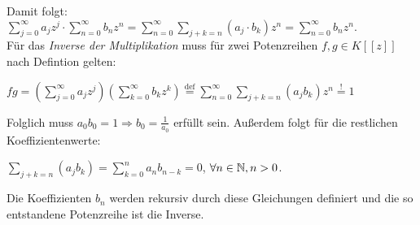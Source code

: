 Damit folgt: $ \sum_{j=0}^\infty a_jz^j \cdot \sum_{n=0}^\infty b_nz^n = \sum_{n=0}^\infty \sum_{j+k=n} \left(a_j\cdot b_k\right)z^n = \sum_{n=0}^\infty b_nz^n. $\\ 
Für das \textit{Inverse der Multiplikation} muss für zwei Potenzreihen $f, g \in K[[z]]$ nach Defintion gelten:
\begin{center}
$fg = \left( \sum_{j=0}^\infty a_j z^j \right) \left( \sum_{k=0}^\infty b_k z^k \right)  
\stackrel{\mathrm{def}}= \sum_{n=0}^\infty\sum_{j+k=n} (a_j b_k) z^n \stackrel{\mathrm{!}}= 1$
\end{center}
Folglich muss $a_0b_0 = 1 \Rightarrow b_0 = \frac{1}{a_0} $ erfüllt sein. Außerdem folgt für die restlichen Koeffizientenwerte:
\begin{center}
$\sum_{j+k=n} (a_j b_k) = \sum_{k=0}^{n} a_nb_{n-k} = 0$, $\forall n \in \mathbb{N}, n > 0$. 
\end{center}
Die Koeffizienten $b_n$ werden rekursiv durch diese Gleichungen definiert und die so entstandene Potenzreihe ist die Inverse. \label{inverse}
%

%
